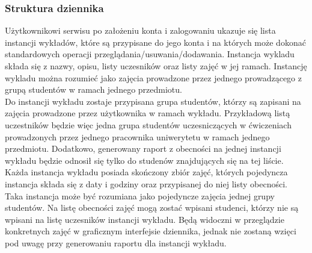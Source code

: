 \documentclass[declaration,shortabstract, mgr]{iithesis}
\begin{document}
\subsubsection{Struktura dziennika}
\indent Użytkownikowi serwisu po założeniu konta i zalogowaniu ukazuje się lista instancji wykładów, które są przypisane do jego konta i na których może dokonać standardowych operacji przeglądania/usuwania/dodawania. Instancja wykladu składa się z nazwy, opisu, listy uczesników oraz listy zajęć w jej ramach. Instancję wykladu można  rozumieć jako zajęcia prowadzone przez jednego prowadzącego z grupą studentów w ramach jednego przedmiotu. \\
\indent Do instancji wykładu zostaje przypisana grupa studentów, którzy są zapisani na zajęcia prowadzone przez użytkownika w ramach wykładu. Przykładową listą uczestników będzie więc jedna grupa studentów uczesniczących w ćwiczeniach prowadzonych przez jednego pracownika uniwerytetu w ramach jednego przedmiotu. Dodatkowo, generowany raport z obecności na jednej instancji wykładu będzie odnosił się tylko do studenów znajdujących się na tej liście.\\
\indent Każda instancja wykładu posiada skończony zbiór zajęć, których pojedyncza instancja składa się z daty i godziny oraz przypisanej do niej listy obecności. Taka instancja może być rozumiana jako pojedyncze zajęcia jednej grupy studentów. Na listę obecności zajęć mogą zostać wpisani studenci, którzy nie są wpisani na listę uczesników instancji wykładu. Będą widoczni w przeglądzie konkretnych zajęć w graficznym interfejsie dziennika, jednak nie zostaną wzięci pod uwagę przy generowaniu raportu dla instancji wykładu.\\
\end{document}
